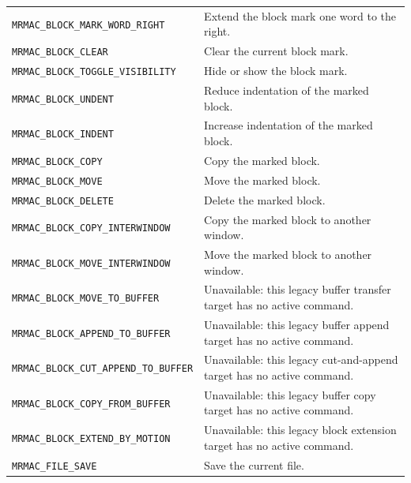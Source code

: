 \documentclass[a4paper,10pt,twoside,openany]{book}
\newenvironment{mrmacextension}{\begin{changebar}}{\end{changebar}}
\begin{document}
\begin{mrmacextension}
\begin{longtable}{@{}L{0.50\textwidth}@{\hspace{0.8em}}L{0.40\textwidth}@{}}
\texttt{MRMAC\_BLOCK\_MARK\_WORD\_RIGHT} & Extend the block mark one word to the right. \\
\texttt{MRMAC\_BLOCK\_CLEAR} & Clear the current block mark. \\
\texttt{MRMAC\_BLOCK\_TOGGLE\_VISIBILITY} & Hide or show the block mark. \\
\texttt{MRMAC\_BLOCK\_UNDENT} & Reduce indentation of the marked block. \\
\texttt{MRMAC\_BLOCK\_INDENT} & Increase indentation of the marked block. \\
\texttt{MRMAC\_BLOCK\_COPY} & Copy the marked block. \\
\texttt{MRMAC\_BLOCK\_MOVE} & Move the marked block. \\
\texttt{MRMAC\_BLOCK\_DELETE} & Delete the marked block. \\
\texttt{MRMAC\_BLOCK\_COPY\_INTERWINDOW} & Copy the marked block to another window. \\
\texttt{MRMAC\_BLOCK\_MOVE\_INTERWINDOW} & Move the marked block to another window. \\
\texttt{MRMAC\_BLOCK\_MOVE\_TO\_BUFFER} & Unavailable: this legacy buffer transfer target has no active command. \\
\texttt{MRMAC\_BLOCK\_APPEND\_TO\_BUFFER} & Unavailable: this legacy buffer append target has no active command. \\
\texttt{MRMAC\_BLOCK\_CUT\_APPEND\_TO\_BUFFER} & Unavailable: this legacy cut-and-append target has no active command. \\
\texttt{MRMAC\_BLOCK\_COPY\_FROM\_BUFFER} & Unavailable: this legacy buffer copy target has no active command. \\
\texttt{MRMAC\_BLOCK\_EXTEND\_BY\_MOTION} & Unavailable: this legacy block extension target has no active command. \\
\texttt{MRMAC\_FILE\_SAVE} & Save the current file. \\
\bottomrule
\end{longtable}
\end{mrmacextension}
\end{document}
